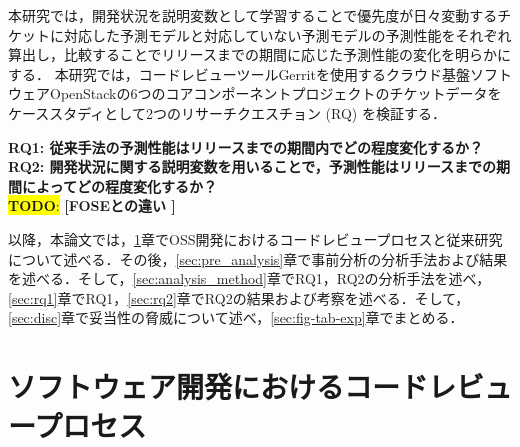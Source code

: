 \documentclass[submit]{ipsj}
\newcommand{\todo}[1]{\colorbox{yellow}{{\bf TODO}:}{\color{red} {\textbf{[#1]}}}}
\newcommand{\rqone}{従来手法の予測性能はリリースまでの期間内でどの程度変化するか？}
\newcommand{\rqtwo}{開発状況に関する説明変数を用いることで，予測性能はリリースまでの期間によってどの程度変化するか？}
\begin{document}
本研究では，開発状況を説明変数として学習することで優先度が日々変動するチケットに対応した予測モデルと対応していない予測モデルの予測性能をそれぞれ算出し，比較することでリリースまでの期間に応じた予測性能の変化を明らかにする．
本研究では，コードレビューツールGerritを使用するクラウド基盤ソフトウェアOpenStackの6つのコアコンポーネントプロジェクトのチケットデータをケーススタディとして2つのリサーチクエスチョン (RQ) を検証する．

\noindent\textbf{RQ1: \rqone}\\
\noindent\textbf{RQ2: \rqtwo}\\

\todo{FOSEとの違い
}

以降，本論文では，\ref{sec:intro}章でOSS開発におけるコードレビュープロセスと従来研究について述べる．その後，\ref{sec:pre_analysis}章で事前分析の分析手法および結果を述べる．そして，\ref{sec:analysis_method}章でRQ1，RQ2の分析手法を述べ，\ref{sec:rq1}章でRQ1，\ref{sec:rq2}章でRQ2の結果および考察を述べる．そして，\ref{sec:disc}章で妥当性の脅威について述べ，\ref{sec:fig-tab-exp}章でまとめる．

\section{ソフトウェア開発におけるコードレビュープロセス}\label{sec:intro}
\end{document}
